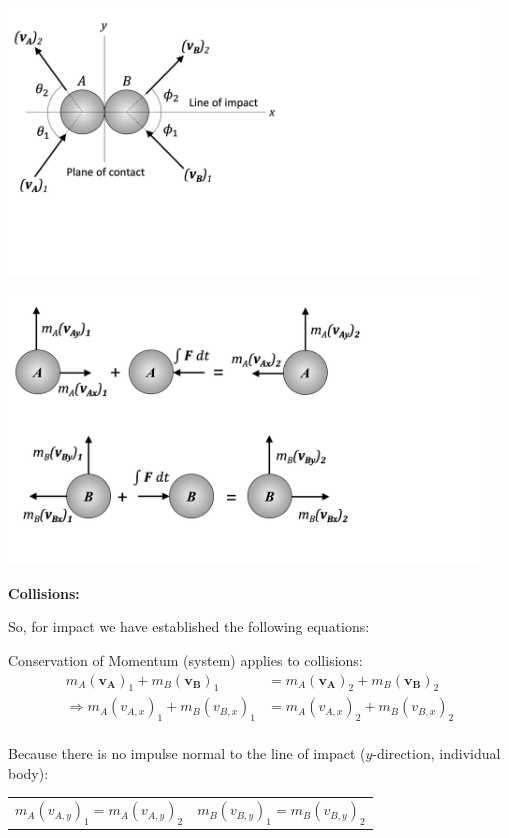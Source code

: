 \documentclass[12pt,letterpaper,twoside]{report}
\begin{document}
\begin{minipage}{0.4\textwidth}
\includegraphics[trim={0cm 5cm 15cm 0cm},clip,width=0.95\textwidth, center]{Slide106}
\end{minipage}
\begin{minipage}{0.6\textwidth}
\includegraphics[trim={0cm 2cm 8cm 0cm},clip,width=0.95\textwidth, center]{Slide112}
\end{minipage}

\textbf{Collisions:}

So, for impact we have established the following equations:

Conservation of Momentum (system) applies to collisions:
\begin{align*}
m_A (\bm{v_A})_1 + m_B (\bm{v_B})_1 &= m_A (\bm{v_A})_2 + m_B (\bm{v_B})_2\\
\Rightarrow m_A (v_{A,x})_1 + m_B (v_{B,x})_1 &=  m_A (v_{A,x})_2 + m_B (v_{B,x})_2\\
\end{align*}

Because there is no impulse normal to the line of impact ($y$-direction, individual body):

\begin{tabu}  to .7\textwidth {  X[c]  X[c]  }
$m_A (v_{A,y})_1 = m_A (v_{A,y})_2$ & $m_B (v_{B,y})_1 = m_B (v_{B,y})_2$\\
\end{tabu} 
\end{document}
